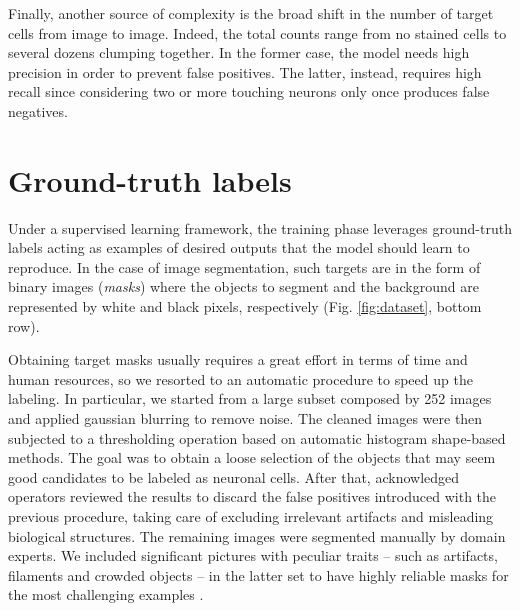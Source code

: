 Finally, another source of complexity is the broad shift in the number of target cells from image to image.
Indeed, the total counts range from no stained cells to several dozens clumping together. 
In the former case, the model needs high precision in order to prevent false positives. The latter, instead,
requires high recall since considering two or more touching neurons only once produces false negatives. 

\section{Ground-truth labels}
Under a supervised learning framework, the training phase leverages ground-truth labels acting as examples of desired outputs that the model should learn to reproduce. In the case of image segmentation, such targets are in the form of binary images (\textit{masks}) where the objects to segment and the background are represented by white and black pixels, respectively (Fig. \ref{fig:dataset}, bottom row).

Obtaining target masks usually requires a great effort in terms of time and human resources, so we resorted to an automatic procedure to speed up the labeling. 
In particular, we started from a large subset composed by 252 images and applied gaussian blurring to remove noise. The cleaned images were then subjected to a thresholding operation based on automatic histogram shape-based methods. 
The goal was to obtain a loose selection of the objects that may seem good candidates to be labeled as neuronal cells. 
After that, acknowledged operators reviewed the results to discard the false positives introduced with the previous procedure, taking care of excluding irrelevant artifacts and misleading biological structures.
The remaining images were segmented manually by domain experts. We included significant pictures with peculiar traits -- such as artifacts, filaments and crowded objects -- in the latter set to have highly reliable masks for the most challenging examples 
.



